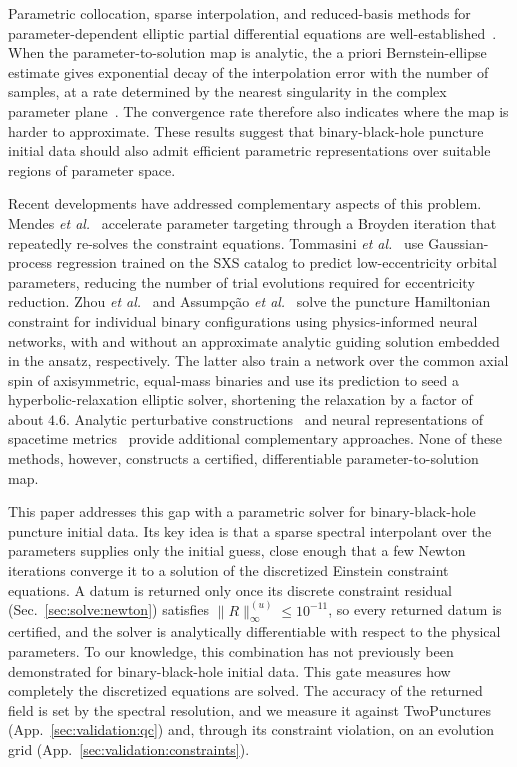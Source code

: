 \documentclass[
  aps,
  prd,
  twocolumn,
  10pt,
  amsmath,
  amssymb,
  nofootinbib,
  superscriptaddress,
  floatfix,
]{revtex4-2}
\newif\ifshowreferee \showrefereetrue
\newcommand{\refereetext}[1]{\ifshowreferee{\color{refereepurple}#1}\else#1\fi}
\begin{document}
Parametric collocation, sparse interpolation, and reduced-basis methods for parameter-dependent elliptic partial differential equations are well-established~\cite{BabuskaNobileTempone2007,XiuHesthaven2005,NobileTemponeWebster2008,Haasdonk2017,HesthavenRozzaStamm2016}.
\refereetext{When the parameter-to-solution map is analytic, the a priori Bernstein-ellipse estimate gives exponential decay of the interpolation error with the number of samples, at a rate determined by the nearest singularity in the complex para\-meter plane~\cite{Trefethen2019}.}
\refereetext{The convergence rate therefore also indicates where the map is harder to approximate.}
These results suggest that binary-black-hole puncture initial data should also admit efficient parametric representations over suitable regions of parameter space.


Recent developments have addressed complementary aspects of this problem.
Mendes \emph{et al.}~\cite{Mendes2025} accelerate para\-meter targeting through a Broyden iteration that repeatedly re-solves the constraint equations.
Tommasini \emph{et al.}~\cite{Tommasini2026} use Gaussian-process regression trained on the SXS catalog to predict low-eccentricity orbital para\-meters, reducing the number of trial evolutions required for eccentricity reduction.
Zhou \emph{et al.}~\cite{Zhou2026} and Assump\c{c}\~ao \emph{et al.}~\cite{Assumpcao2026} solve the puncture Hamiltonian constraint for individual binary configurations using physics-informed neural networks, with and without an approximate analytic guiding solution embedded in the ansatz, respectively.
The latter also train a network over the common axial spin of axisymmetric, equal-mass binaries and use its prediction to seed a hyperbolic-relaxation elliptic solver, shortening the relaxation by a factor of about $4.6$.
Analytic perturbative constructions~\cite{Ogurol2026} and neural representations of spacetime metrics~\cite{Cranganore2025} provide additional complementary approaches.
None of these methods, however, constructs a certified, differentiable parameter-to-solution map.


This paper addresses this gap with a parametric solver for binary-black-hole puncture initial data.
\refereetext{Its key idea is that a sparse spectral interpolant over the parameters supplies only the initial guess, close enough that a few Newton iterations converge it to a solution of the discretized Einstein constraint equations.}
A datum is returned only once its discrete constraint residual (Sec.~\ref{sec:solve:newton}) satisfies $\|R\|^{(u)}_\infty \le 10^{-11}$, so every returned datum is certified, and the solver is analytically differentiable with respect to the physical parameters.
To our knowledge, this combination has not previously been demonstrated for binary-black-hole initial data.
This gate measures how completely the discretized equations are solved. The accuracy of the returned field is set by the spectral resolution, and we measure it against TwoPunctures (App.~\ref{sec:validation:qc}) and, through its constraint violation, on an evolution grid (App.~\ref{sec:validation:constraints}).
\end{document}
